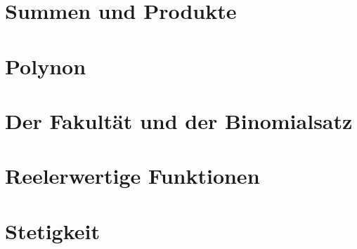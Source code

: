 \documentclass[12pt, twoside, openright]{report}
\theoremstyle{definition} %
\theoremstyle{definition} %
\theoremstyle{definition} %
\theoremstyle{definition} %
\theoremstyle{definition} %
\theoremstyle{remark} %
\begin{document}
		\section{Summen und Produkte}
		
		\section{Polynon}
		
		\section{Der Fakultät und der Binomialsatz}
		
		\section{Reelerwertige Funktionen}
		
		\section{Stetigkeit}
	
\end{document}
